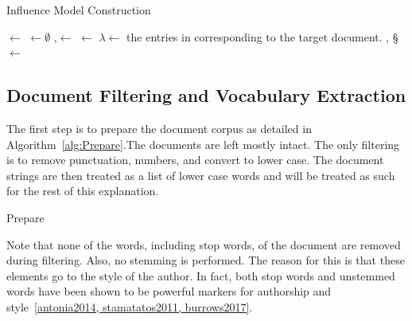 \documentclass[../ut-dissertation.tex]{subfiles}
\begin{document}
\begin{algorithm}
  \caption{Influence Model Construction}
  \label{alg:model}
  
   
   
   
  
  \Output{\W, \S, \F}
  \BlankLine
  \;
  \V $\leftarrow$ \;
  \C $\leftarrow\emptyset$\;
  \LN,\F $\leftarrow$ \;
  \DM $\leftarrow$ \DistanceMatrix{\F}\;
  $\lambda \leftarrow$ the entries in \LN corresponding to the target document.\;
  \W, \S $\leftarrow$ \;
  \Return{\W, \S, \F}\;

\end{algorithm}

\subsection{Document Filtering and Vocabulary Extraction}
The first step is to prepare the document corpus as detailed in
Algorithm~\ref{alg:Prepare}.The documents are
left mostly intact.  The only filtering is to remove punctuation,
numbers, and convert to lower case.  The document strings are then
treated as a list of lower case words and will be treated as such for
the rest of this explanation.

\begin{algorithm}
  \caption{Prepare}
  \label{alg:Prepare}
  \BlankLine
\end{algorithm}

Note that none of the words, including stop words, of the document are
removed during filtering.  Also, no stemming is performed.  The reason
for this is that these elements go to the style of the author.  In
fact, both stop words and unstemmed words have been shown to be
powerful markers for authorship and style~\ref{antonia2014,
  stamatatos2011, burrows2017}.  
\end{document}
